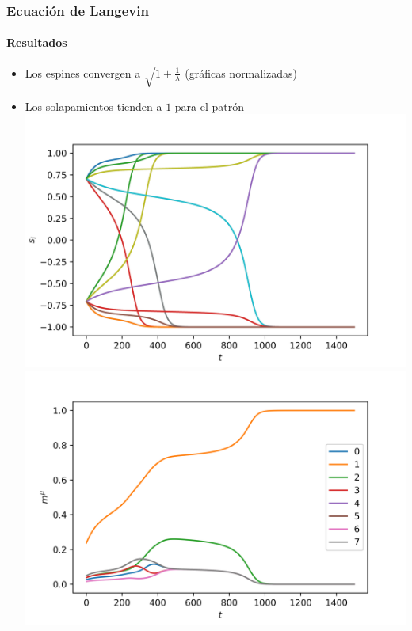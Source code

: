 \documentclass[11pt]{beamer}
\begin{document}
\begin{frame}
\frametitle{Ecuación de Langevin}
\framesubtitle{Resultados}
\begin{itemize}
	\item Los espines convergen a $\sqrt{1+\frac{1}{\lambda}}$ (gráficas normalizadas)
	\item Los solapamientos tienden a $1$ para el patrón 
	\centering
	\includegraphics[width=0.45\linewidth]{spines_langevin.png}
	\includegraphics[width=0.45\linewidth]{overlap_langevin.png}
\end{itemize}
\end{frame}

\end{document}
